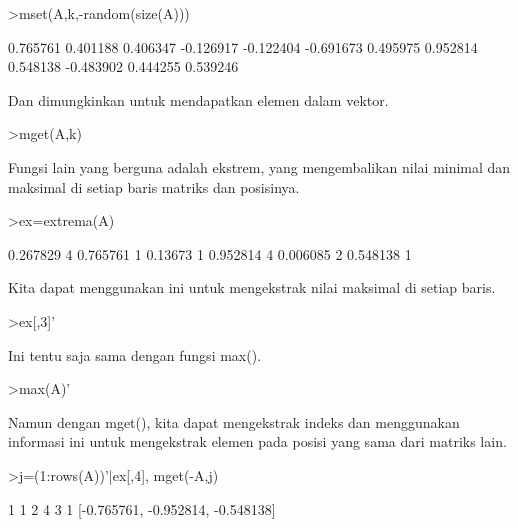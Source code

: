 \begin{eulernotebook}
\begin{eulercomment}
\begin{eulercomment}
\begin{eulerprompt}
>mset(A,k,-random(size(A)))
\end{eulerprompt}
\begin{euleroutput}
       0.765761      0.401188      0.406347     -0.126917 
      -0.122404     -0.691673      0.495975      0.952814 
       0.548138     -0.483902      0.444255      0.539246 
\end{euleroutput}
\begin{eulercomment}
Dan dimungkinkan untuk mendapatkan elemen dalam vektor.
\end{eulercomment}
\begin{eulerprompt}
>mget(A,k)
\end{eulerprompt}
\begin{euleroutput}
  [0.267829,  0.13673,  0.390567,  0.006085]
\end{euleroutput}
\begin{eulercomment}
Fungsi lain yang berguna adalah ekstrem, yang mengembalikan nilai
minimal dan maksimal di setiap baris matriks dan posisinya.
\end{eulercomment}
\begin{eulerprompt}
>ex=extrema(A)
\end{eulerprompt}
\begin{euleroutput}
       0.267829             4      0.765761             1 
        0.13673             1      0.952814             4 
       0.006085             2      0.548138             1 
\end{euleroutput}
\begin{eulercomment}
Kita dapat menggunakan ini untuk mengekstrak nilai maksimal di setiap
baris.
\end{eulercomment}
\begin{eulerprompt}
>ex[,3]'
\end{eulerprompt}
\begin{euleroutput}
  [0.765761,  0.952814,  0.548138]
\end{euleroutput}
\begin{eulercomment}
Ini tentu saja sama dengan fungsi max().
\end{eulercomment}
\begin{eulerprompt}
>max(A)'
\end{eulerprompt}
\begin{euleroutput}
  [0.765761,  0.952814,  0.548138]
\end{euleroutput}
\begin{eulercomment}
Namun dengan mget(), kita dapat mengekstrak indeks dan menggunakan
informasi ini untuk mengekstrak elemen pada posisi yang sama dari
matriks lain.
\end{eulercomment}
\begin{eulerprompt}
>j=(1:rows(A))'|ex[,4], mget(-A,j)
\end{eulerprompt}
\begin{euleroutput}
              1             1 
              2             4 
              3             1 
  [-0.765761,  -0.952814,  -0.548138]
  \\
\end{euleroutput}


\end{eulercomment}
\end{eulercomment}
\end{eulernotebook}
